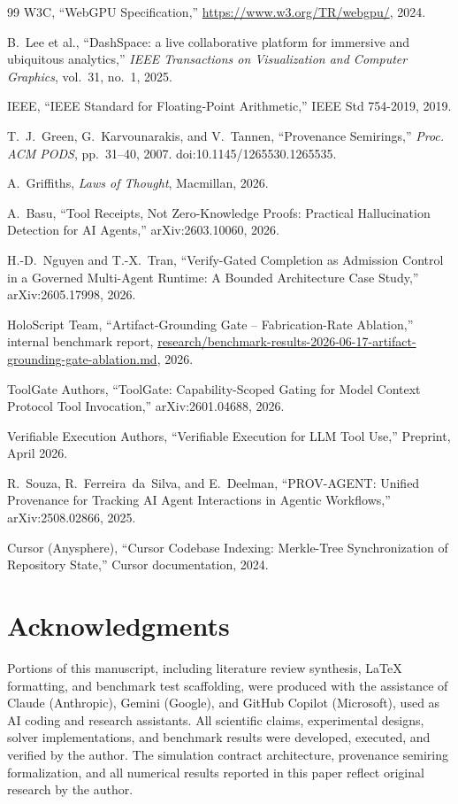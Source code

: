 \documentclass[journal]{IEEEtran}
\begin{document}
\begin{thebibliography}{99}
  W3C,
  ``WebGPU Specification,''
  \url{https://www.w3.org/TR/webgpu/}, 2024.

  B.~Lee et al.,
  ``DashSpace: a live collaborative platform for immersive and ubiquitous
  analytics,''
  \emph{IEEE Transactions on Visualization and Computer Graphics},
  vol.~31, no.~1, 2025.

  IEEE,
  ``IEEE Standard for Floating-Point Arithmetic,''
  IEEE Std 754-2019, 2019.

  T.~J.~Green, G.~Karvounarakis, and V.~Tannen,
  ``Provenance Semirings,''
  \emph{Proc. ACM PODS}, pp.~31--40, 2007.
  doi:10.1145/1265530.1265535.

  A.~Griffiths,
  \emph{Laws of Thought},
  Macmillan, 2026.

  A.~Basu,
  ``Tool Receipts, Not Zero-Knowledge Proofs: Practical Hallucination
  Detection for AI Agents,''
  arXiv:2603.10060, 2026.

  H.-D.~Nguyen and T.-X.~Tran,
  ``Verify-Gated Completion as Admission Control in a Governed
  Multi-Agent Runtime: A Bounded Architecture Case Study,''
  arXiv:2605.17998, 2026.

  HoloScript Team,
  ``Artifact-Grounding Gate -- Fabrication-Rate Ablation,''
  internal benchmark report,
  \url{research/benchmark-results-2026-06-17-artifact-grounding-gate-ablation.md},
  2026.

  ToolGate Authors,
  ``ToolGate: Capability-Scoped Gating for Model Context Protocol Tool
  Invocation,''
  arXiv:2601.04688, 2026.

  Verifiable Execution Authors,
  ``Verifiable Execution for LLM Tool Use,''
  Preprint, April 2026.

  R.~Souza, R.~Ferreira~da~Silva, and E.~Deelman,
  ``PROV-AGENT: Unified Provenance for Tracking AI Agent Interactions in
  Agentic Workflows,''
  arXiv:2508.02866, 2025.

  Cursor (Anysphere),
  ``Cursor Codebase Indexing: Merkle-Tree Synchronization of Repository
  State,''
  Cursor documentation, 2024.

\end{thebibliography}
  \fi

\section*{Acknowledgments}

Portions of this manuscript, including literature review synthesis,
LaTeX formatting, and benchmark test scaffolding, were produced with
the assistance of Claude (Anthropic), Gemini (Google), and GitHub
Copilot (Microsoft), used as AI coding and research assistants. All
scientific claims, experimental designs, solver implementations,
and benchmark results were developed, executed, and verified by the
author. The simulation contract architecture, provenance semiring
formalization, and all numerical results reported in this paper
reflect original research by the author.
\end{document}
